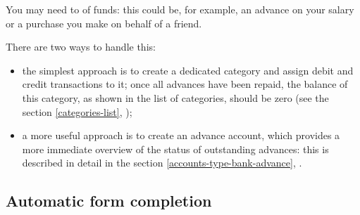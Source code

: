 You may need to  of funds: this could be, for example, an advance on your salary or a purchase you make on behalf of a friend.

There are two ways to handle this:
\begin{itemize}
	\item the simplest approach is to create a dedicated category and assign debit and credit transactions to it; once all advances have been repaid, the balance of this category, as shown in the list of categories, should be zero (see the section \vref{categories-list}, );
	\item a more useful approach is to create an advance account, which provides a more immediate overview of the status of outstanding advances: this is described in detail in the section \vref{accounts-type-bank-advance}, .
\end{itemize}


\subsection{Automatic form completion\label{transactions-new-autofill}}%

